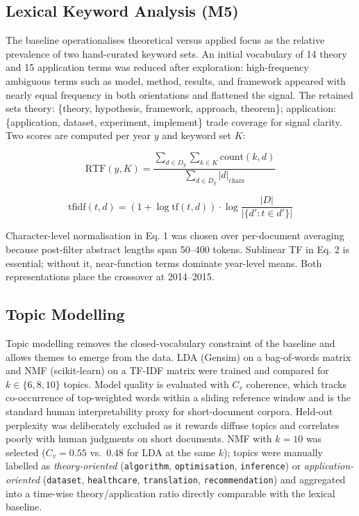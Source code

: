 \subsection{Lexical Keyword Analysis (M5)}

The baseline operationalises theoretical versus applied focus as the relative prevalence of two hand-curated keyword sets. An initial vocabulary of 14 theory and 15 application terms was reduced after exploration: high-frequency ambiguous terms such as model, method, results, and framework appeared with nearly equal frequency in both orientations and flattened the signal. The retained sets theory: \{theory, hypothesis, framework, approach, theorem\}; application: \{application, dataset, experiment, implement\} trade coverage for signal clarity. Two scores are computed per year $y$ and keyword set $K$:

{\small
\begin{equation}
\text{RTF}(y, K) = \frac{\sum_{d \in D_y} \sum_{k \in K} \text{count}(k,d)}{\sum_{d \in D_y} |d|_{\text{chars}}}
\end{equation}
}

{\small
\begin{equation}
\text{tfidf}(t,d) = (1 + \log \text{tf}(t,d)) \cdot \log \frac{|D|}{|\{d' : t \in d'\}|}
\end{equation}
}

Character-level normalisation in Eq. 1 was chosen over per-document averaging because post-filter abstract lengths span 50–400 tokens. Sublinear TF in Eq. 2 is essential; without it, near-function terms dominate year-level means. Both representations place the crossover at 2014–2015.

\subsection{Topic Modelling}

Topic modelling removes the closed-vocabulary constraint of the baseline and allows themes to emerge from the data. LDA (Gensim) on a bag-of-words matrix and NMF (scikit-learn) on a TF-IDF matrix were trained and compared for $k \in \{6, 8, 10\}$ topics. Model quality is evaluated with $C_v$ coherence, which tracks co-occurrence of top-weighted words within a sliding reference window and is the standard human interpretability proxy for short-document corpora. Held-out perplexity was deliberately excluded as it rewards diffuse topics and correlates poorly with human judgments on short documents. NMF with $k = 10$ was selected ($C_v = 0.55$ vs.\ $0.48$ for LDA at the same $k$); topics were manually labelled as \textit{theory-oriented} (\texttt{algorithm}, \texttt{optimisation}, \texttt{inference}) or \textit{application-oriented} (\texttt{dataset}, \texttt{healthcare}, \texttt{translation}, \texttt{recommendation}) and aggregated into a time-wise theory/application ratio directly comparable with the lexical baseline.
